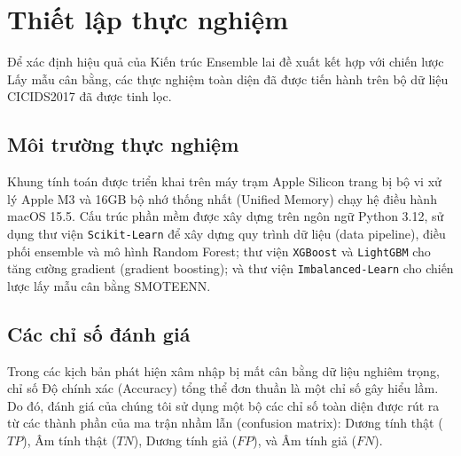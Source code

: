 \section{Thiết lập thực nghiệm}
Để xác định hiệu quả của Kiến trúc Ensemble lai đề xuất kết hợp với chiến lược Lấy mẫu cân bằng, các thực nghiệm toàn diện đã được tiến hành trên bộ dữ liệu CICIDS2017 đã được tinh lọc.

\subsection{Môi trường thực nghiệm}
Khung tính toán được triển khai trên máy trạm Apple Silicon trang bị bộ vi xử lý Apple M3 và 16GB bộ nhớ thống nhất (Unified Memory) chạy hệ điều hành macOS 15.5. Cấu trúc phần mềm được xây dựng trên ngôn ngữ Python 3.12, sử dụng thư viện \texttt{Scikit-Learn} để xây dựng quy trình dữ liệu (data pipeline), điều phối ensemble và mô hình Random Forest; thư viện \texttt{XGBoost} và \texttt{LightGBM} cho tăng cường gradient (gradient boosting); và thư viện \texttt{Imbalanced-Learn} cho chiến lược lấy mẫu cân bằng SMOTEENN.

\subsection{Các chỉ số đánh giá}
Trong các kịch bản phát hiện xâm nhập bị mất cân bằng dữ liệu nghiêm trọng, chỉ số Độ chính xác (Accuracy) tổng thể đơn thuần là một chỉ số gây hiểu lầm. Do đó, đánh giá của chúng tôi sử dụng một bộ các chỉ số toàn diện được rút ra từ các thành phần của ma trận nhầm lẫn (confusion matrix): Dương tính thật ($TP$), Âm tính thật ($TN$), Dương tính giả ($FP$), và Âm tính giả ($FN$).

